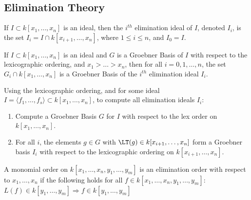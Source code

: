         \subsection{Elimination Theory}
            \begin{definition}
                If $I\subset{k}[x_1,\hdots,x_{n}]$ is an ideal,
                then the $i^{th}$ elimination ideal of $I$,
                denoted $I_{i}$, is the set
                $I_{i}=I\cap{k}[x_{i+1},\hdots,x_{n}]$,
                where $1\leq{i}\leq{n}$, and $I_{0}=I$.
            \end{definition}
            \begin{theorem}
                If $I\subset k[x_1,\hdots ,x_n]$ is an ideal and
                $G$ is a Groebner Basis of $I$ with respect to the
                lexicographic ordering, and $x_1>\hdots > x_n$, then
                for all $i=0,1,\hdots,n$, the set
                $G_{i}\cap{k}[x_1,\hdots,x_n]$ is a Groebner Basis of
                the $i^{th}$ elimination ideal $I_{i}$.
            \end{theorem}
            \begin{remark}
                Using the lexicographic ordering, and for some ideal
                $I=\langle{f_{1}},\hdots,f_{s}\rangle%
                   \subset{k}[x_1,\hdots ,x_n]$,
                to compute all elimination ideals $I_{i}$:
                \begin{enumerate}
                    \item Compute a Groebner Basis $G$ for $I$ with
                          respect to the lex order on $k[x_1,\hdots,x_n]$.
                    \item For all $i$, the elements $g\in G$ with
                          $\LT(g)\in{k}[x_{i+1},\hdots,x_{n}]$ form a
                          Groebner basis $I_{i}$ with respect to
                          the lexicographic ordering on
                          $k[x_{i+1},\hdots,x_n]$.
                \end{enumerate}
            \end{remark}
            \begin{definition}
                A monomial order on
                $k[x_{1},\hdots,x_{n},y_{1},\hdots,y_{m}]$
                is an elimination order with respect to
                $x_{1},\hdots,x_{n}$ if the following holds for
                all $f\in{k}[x_{1},\hdots,x_{n},y_{1},\hdots,y_{m}]$:
                $L(f)\in{k}[y_{1},\hdots,y_{m}]%
                 \Rightarrow{f}\in{k}[y_{1},\hdots,y_{m}]$
            \end{definition}
